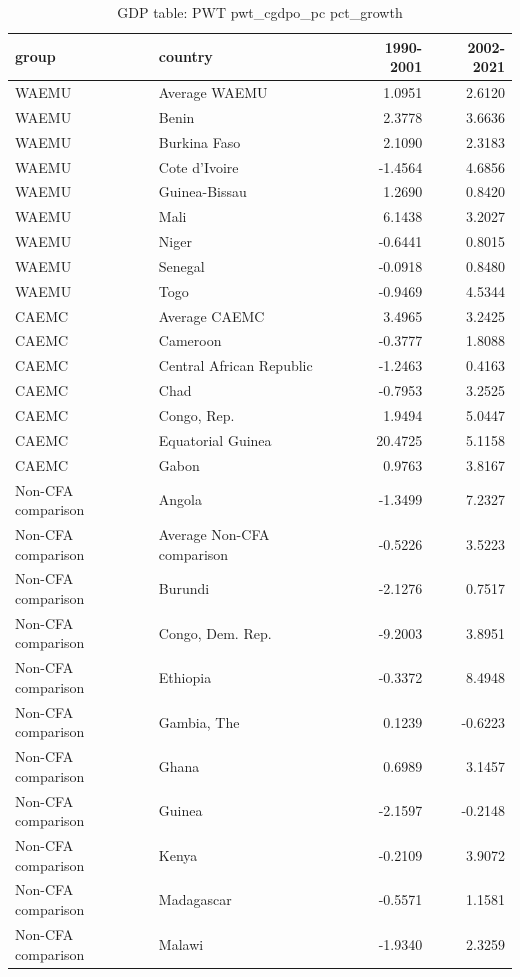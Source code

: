 \begin{table}

\caption{GDP table: PWT pwt_cgdpo_pc pct_growth}
\centering
\begin{tabular}[t]{llrr}
\toprule
group & country & 1990-2001 & 2002-2021\\
\midrule
WAEMU & Average WAEMU & 1.0951 & 2.6120\\
WAEMU & Benin & 2.3778 & 3.6636\\
WAEMU & Burkina Faso & 2.1090 & 2.3183\\
WAEMU & Cote d'Ivoire & -1.4564 & 4.6856\\
WAEMU & Guinea-Bissau & 1.2690 & 0.8420\\
\addlinespace
WAEMU & Mali & 6.1438 & 3.2027\\
WAEMU & Niger & -0.6441 & 0.8015\\
WAEMU & Senegal & -0.0918 & 0.8480\\
WAEMU & Togo & -0.9469 & 4.5344\\
CAEMC & Average CAEMC & 3.4965 & 3.2425\\
\addlinespace
CAEMC & Cameroon & -0.3777 & 1.8088\\
CAEMC & Central African Republic & -1.2463 & 0.4163\\
CAEMC & Chad & -0.7953 & 3.2525\\
CAEMC & Congo, Rep. & 1.9494 & 5.0447\\
CAEMC & Equatorial Guinea & 20.4725 & 5.1158\\
\addlinespace
CAEMC & Gabon & 0.9763 & 3.8167\\
Non-CFA comparison & Angola & -1.3499 & 7.2327\\
Non-CFA comparison & Average Non-CFA comparison & -0.5226 & 3.5223\\
Non-CFA comparison & Burundi & -2.1276 & 0.7517\\
Non-CFA comparison & Congo, Dem. Rep. & -9.2003 & 3.8951\\
\addlinespace
Non-CFA comparison & Ethiopia & -0.3372 & 8.4948\\
Non-CFA comparison & Gambia, The & 0.1239 & -0.6223\\
Non-CFA comparison & Ghana & 0.6989 & 3.1457\\
Non-CFA comparison & Guinea & -2.1597 & -0.2148\\
Non-CFA comparison & Kenya & -0.2109 & 3.9072\\
\addlinespace
Non-CFA comparison & Madagascar & -0.5571 & 1.1581\\
Non-CFA comparison & Malawi & -1.9340 & 2.3259\\

\end{tabular}
\end{table}

